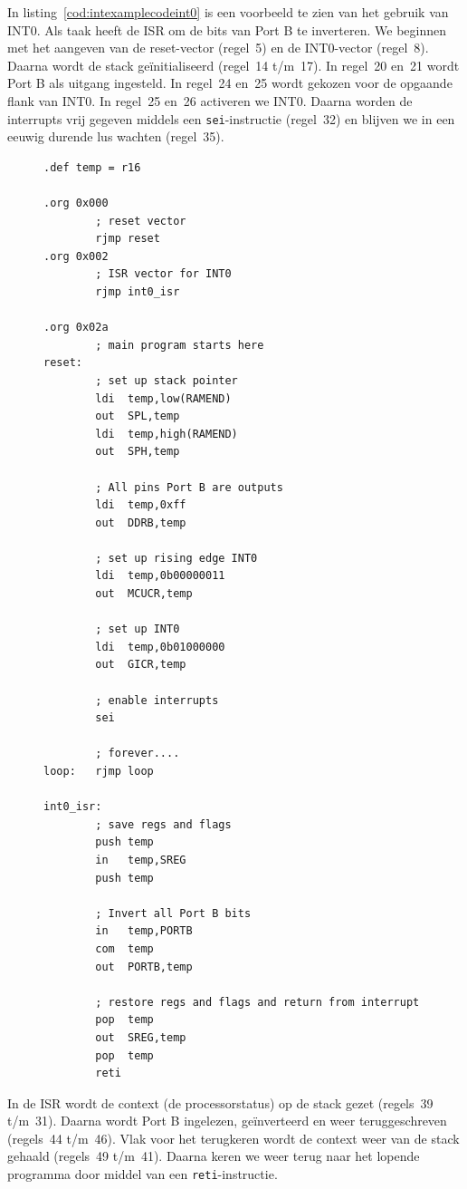 In listing~\ref{cod:intexamplecodeint0} is een voorbeeld te zien van het
gebruik van INT0. Als taak heeft de ISR om de bits van Port B te
inverteren. We beginnen met het aangeven van de reset-vector (regel~5) en de
INT0-vector (regel~8). Daarna wordt de stack ge\"initialiseerd (regel~14
t/m~17). In regel~20 en~21 wordt Port B als uitgang ingesteld. In regel~24
en~25 wordt gekozen voor de opgaande flank van INT0. In regel~25 en~26
activeren we INT0. Daarna worden de interrupts vrij gegeven middels een
\lstinline|sei|-instructie (regel~32) en blijven we in een eeuwig durende lus
wachten (regel~35).

\begin{figure}[!p]
\begin{lstlisting}[language=AVRassembler,caption=Voorbeeldprogramma INT0 met opgaande flank en ISR.,label=cod:intexamplecodeint0]
.def temp = r16

.org 0x000
        ; reset vector
		rjmp reset
.org 0x002
        ; ISR vector for INT0
		rjmp int0_isr

.org 0x02a
        ; main program starts here
reset:
		; set up stack pointer
		ldi	 temp,low(RAMEND)
		out	 SPL,temp
		ldi	 temp,high(RAMEND)
		out	 SPH,temp
		
		; All pins Port B are outputs
		ldi  temp,0xff
		out  DDRB,temp

		; set up rising edge INT0
		ldi	 temp,0b00000011
		out	 MCUCR,temp

		; set up INT0
		ldi	 temp,0b01000000
		out	 GICR,temp

		; enable interrupts
		sei

		; forever....
loop: 	rjmp loop

int0_isr:
        ; save regs and flags
		push temp
		in   temp,SREG
		push temp

        ; Invert all Port B bits
        in   temp,PORTB
        com  temp
        out  PORTB,temp

		; restore regs and flags and return from interrupt
		pop	 temp
		out	 SREG,temp
		pop	 temp
 		reti
\end{lstlisting}
\end{figure}

In de ISR wordt de context (de processorstatus) op de stack gezet (regels~39
t/m~31). Daarna wordt Port B ingelezen, ge\"inverteerd en weer
teruggeschreven (regels~44 t/m~46). Vlak voor het terugkeren wordt de context
weer van de stack gehaald (regels~49 t/m~41). Daarna keren we weer terug naar
het lopende programma door middel van een \lstinline|reti|-instructie.

